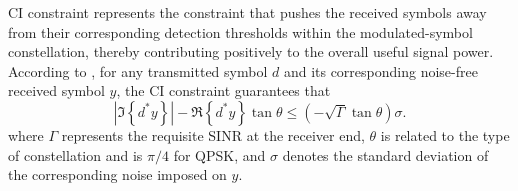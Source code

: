 \documentclass[lettersize,journal]{IEEEtran}
\newcommand{\nocolor}[1]{{\color{black}#1}}
\begin{document}
CI constraint represents the constraint that pushes the received symbols away from their corresponding detection thresholds within the modulated-symbol constellation, thereby contributing positively to the overall useful signal power. According to \cite{masouros2015exploiting}, for any transmitted symbol $d$ and its corresponding \nocolor{noise-free} received symbol $y$, the CI constraint guarantees that
\begin{equation}
\label{eq:original_ci}
    \left| \Im\left\{d^* y\right\} \right| - \Re\left\{d^* y\right\}\tan\theta \leq (-\sqrt{\Gamma}\tan\theta)\sigma.
\end{equation}
where $\Gamma$ represents the requisite SINR at the receiver end, \nocolor{$\theta$ is related to the type of constellation and is $\pi/4$ for QPSK}, and $\sigma$ denotes the standard deviation of the corresponding noise imposed on $y$.
\end{document}
